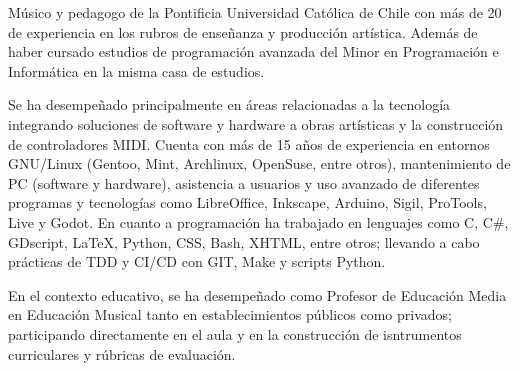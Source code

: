 

\begin{cvparagraph}

Músico y pedagogo de la Pontificia Universidad Católica de Chile con más de 20
de experiencia en los rubros de enseñanza y producción artística. Además de
haber cursado estudios de programación avanzada del Minor en Programación e
Informática en la misma casa de estudios.

Se ha desempeñado principalmente en áreas relacionadas a la tecnología
integrando soluciones de software y hardware a obras artísticas y la
construcción de controladores MIDI. Cuenta con más de 15 años de experiencia en
entornos GNU/Linux (Gentoo, Mint, Archlinux, OpenSuse, entre otros),
mantenimiento de PC (software y hardware), asistencia a usuarios y uso avanzado
de diferentes programas y tecnologías como LibreOffice, Inkscape, Arduino,
Sigil, ProTools, Live y Godot. En cuanto a programación ha trabajado en
lenguajes como C, C\#, GDscript, LaTeX, Python, CSS, Bash, XHTML, entre otros;
llevando a cabo prácticas de TDD y CI/CD con GIT, Make y scripts Python.

En el contexto educativo, se ha desempeñado como Profesor de Educación Media en
Educación Musical tanto en establecimientos públicos como privados;
participando directamente en el aula y en la construcción de isntrumentos
curriculares y rúbricas de evaluación.

\end{cvparagraph}

